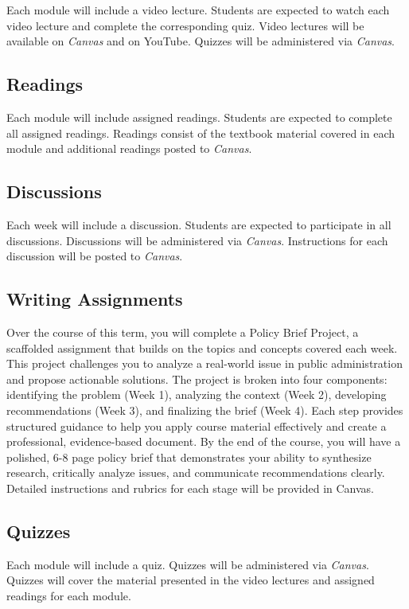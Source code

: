 \documentclass[11pt, letterpaper]{article}
\begin{document}
Each module will include a video lecture. Students are expected to watch each video lecture and complete the corresponding quiz. Video lectures will be available on \emph{Canvas} and on YouTube. Quizzes will be administered via \emph{Canvas}.

\subsection*{Readings}

Each module will include assigned readings. Students are expected to complete all assigned readings. Readings consist of the textbook material covered in each module and additional readings posted to \emph{Canvas}.

\subsection*{Discussions}

Each week will include a discussion. Students are expected to participate in all discussions. Discussions will be administered via \emph{Canvas}. Instructions for each discussion will be posted to \emph{Canvas}.

\subsection*{Writing Assignments}
Over the course of this term, you will complete a Policy Brief Project, a scaffolded assignment that builds on the topics and concepts covered each week. This project challenges you to analyze a real-world issue in public administration and propose actionable solutions. The project is broken into four components: identifying the problem (Week 1), analyzing the context (Week 2), developing recommendations (Week 3), and finalizing the brief (Week 4). Each step provides structured guidance to help you apply course material effectively and create a professional, evidence-based document. By the end of the course, you will have a polished, 6-8 page policy brief that demonstrates your ability to synthesize research, critically analyze issues, and communicate recommendations clearly. Detailed instructions and rubrics for each stage will be provided in Canvas.

\subsection*{Quizzes}
Each module will include a quiz. Quizzes will be administered via \emph{Canvas}. Quizzes will cover the material presented in the video lectures and assigned readings for each module.
\end{document}

